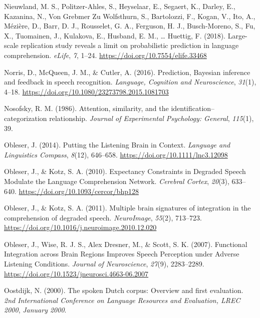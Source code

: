 \documentclass[a4paper, nobind]{templates/ociamthesis}
\newlength{\cslhangindent}
\newenvironment{CSLReferences}[2] %
 {%
  \setlength{\parindent}{0pt}
  \ifodd #1
  \let\oldpar\par
  \def\par{\hangindent=\cslhangindent\oldpar}
  \fi
  \setlength{\parskip}{1mm}
  \setlength{\baselineskip}{6mm}
 }%
 {}
\begin{document}
\begin{CSLReferences}{1}{0}
\leavevmode{}%
Nieuwland, M. S., Politzer-Ahles, S., Heyselaar, E., Segaert, K., Darley, E., Kazanina, N., Von Grebmer Zu Wolfsthurn, S., Bartolozzi, F., Kogan, V., Ito, A., Mézière, D., Barr, D. J., Rousselet, G. A., Ferguson, H. J., Busch-Moreno, S., Fu, X., Tuomainen, J., Kulakova, E., Husband, E. M., \ldots{} Huettig, F. (2018). {Large-scale replication study reveals a limit on probabilistic prediction in language comprehension}. \emph{eLife}, \emph{7}, 1--24. \url{https://doi.org/10.7554/elife.33468}

\leavevmode{}%
Norris, D., McQueen, J. M., \& Cutler, A. (2016). {Prediction, Bayesian inference and feedback in speech recognition}. \emph{Language, Cognition and Neuroscience}, \emph{31}(1), 4--18. \url{https://doi.org/10.1080/23273798.2015.1081703}

\leavevmode{}%
Nosofsky, R. M. (1986). Attention, similarity, and the identification--categorization relationship. \emph{Journal of Experimental Psychology: General}, \emph{115}(1), 39.

\leavevmode{}%
Obleser, J. (2014). Putting the Listening Brain in Context. \emph{Language and Linguistics Compass}, \emph{8}(12), 646--658. \url{https://doi.org/10.1111/lnc3.12098}

\leavevmode{}%
Obleser, J., \& Kotz, S. A. (2010). Expectancy Constraints in Degraded Speech Modulate the Language Comprehension Network. \emph{Cerebral Cortex}, \emph{20}(3), 633--640. \url{https://doi.org/10.1093/cercor/bhp128}

\leavevmode{}%
Obleser, J., \& Kotz, S. A. (2011). Multiple brain signatures of integration in the comprehension of degraded speech. \emph{NeuroImage}, \emph{55}(2), 713--723. \url{https://doi.org/10.1016/j.neuroimage.2010.12.020}

\leavevmode{}%
Obleser, J., Wise, R. J. S., Alex Dresner, M., \& Scott, S. K. (2007). Functional Integration across Brain Regions Improves Speech Perception under Adverse Listening Conditions. \emph{Journal of Neuroscience}, \emph{27}(9), 2283--2289. \url{https://doi.org/10.1523/jneurosci.4663-06.2007}

\leavevmode{}%
Oostdijk, N. (2000). {The spoken Dutch corpus: Overview and first evaluation}. \emph{2nd International Conference on Language Resources and Evaluation, LREC 2000}, \emph{January 2000}.


\end{CSLReferences}
\end{document}
